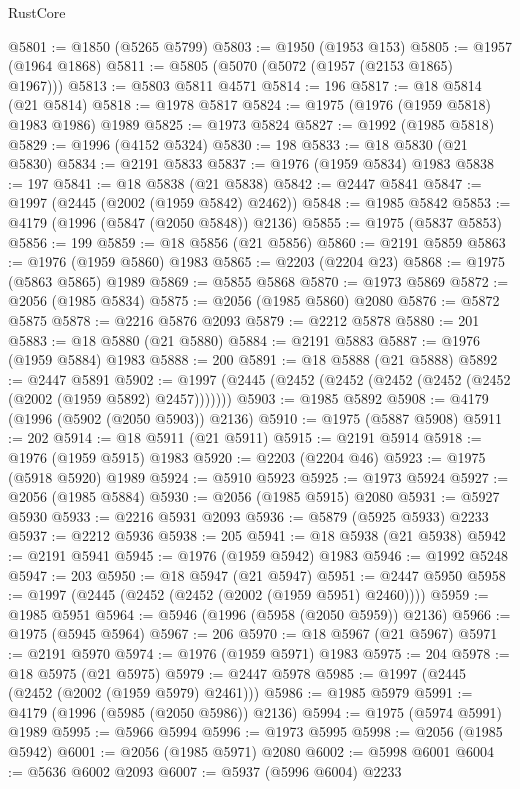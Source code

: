 \begin{lexlean}{RustCore}
\begin{coremodule}
@5801 := @1850 (@5265 @5799)
@5803 := @1950 (@1953 @153)
@5805 := @1957 (@1964 @1868)
@5811 := @5805 (@5070 (@5072 (@1957 (@2153 @1865) @1967)))
@5813 := @5803 @5811 @4571
@5814 := 196
@5817 := @18 @5814 (@21 @5814)
@5818 := @1978 @5817
@5824 := @1975 (@1976 (@1959 @5818) @1983 @1986) @1989
@5825 := @1973 @5824
@5827 := @1992 (@1985 @5818)
@5829 := @1996 (@4152 @5324)
@5830 := 198
@5833 := @18 @5830 (@21 @5830)
@5834 := @2191 @5833
@5837 := @1976 (@1959 @5834) @1983
@5838 := 197
@5841 := @18 @5838 (@21 @5838)
@5842 := @2447 @5841
@5847 := @1997 (@2445 (@2002 (@1959 @5842) @2462))
@5848 := @1985 @5842
@5853 := @4179 (@1996 (@5847 (@2050 @5848)) @2136)
@5855 := @1975 (@5837 @5853)
@5856 := 199
@5859 := @18 @5856 (@21 @5856)
@5860 := @2191 @5859
@5863 := @1976 (@1959 @5860) @1983
@5865 := @2203 (@2204 @23)
@5868 := @1975 (@5863 @5865) @1989
@5869 := @5855 @5868
@5870 := @1973 @5869
@5872 := @2056 (@1985 @5834)
@5875 := @2056 (@1985 @5860) @2080
@5876 := @5872 @5875
@5878 := @2216 @5876 @2093
@5879 := @2212 @5878
@5880 := 201
@5883 := @18 @5880 (@21 @5880)
@5884 := @2191 @5883
@5887 := @1976 (@1959 @5884) @1983
@5888 := 200
@5891 := @18 @5888 (@21 @5888)
@5892 := @2447 @5891
@5902 := @1997 (@2445 (@2452 (@2452 (@2452 (@2452 (@2452 (@2002 (@1959 @5892) @2457)))))))
@5903 := @1985 @5892
@5908 := @4179 (@1996 (@5902 (@2050 @5903)) @2136)
@5910 := @1975 (@5887 @5908)
@5911 := 202
@5914 := @18 @5911 (@21 @5911)
@5915 := @2191 @5914
@5918 := @1976 (@1959 @5915) @1983
@5920 := @2203 (@2204 @46)
@5923 := @1975 (@5918 @5920) @1989
@5924 := @5910 @5923
@5925 := @1973 @5924
@5927 := @2056 (@1985 @5884)
@5930 := @2056 (@1985 @5915) @2080
@5931 := @5927 @5930
@5933 := @2216 @5931 @2093
@5936 := @5879 (@5925 @5933) @2233
@5937 := @2212 @5936
@5938 := 205
@5941 := @18 @5938 (@21 @5938)
@5942 := @2191 @5941
@5945 := @1976 (@1959 @5942) @1983
@5946 := @1992 @5248
@5947 := 203
@5950 := @18 @5947 (@21 @5947)
@5951 := @2447 @5950
@5958 := @1997 (@2445 (@2452 (@2452 (@2002 (@1959 @5951) @2460))))
@5959 := @1985 @5951
@5964 := @5946 (@1996 (@5958 (@2050 @5959)) @2136)
@5966 := @1975 (@5945 @5964)
@5967 := 206
@5970 := @18 @5967 (@21 @5967)
@5971 := @2191 @5970
@5974 := @1976 (@1959 @5971) @1983
@5975 := 204
@5978 := @18 @5975 (@21 @5975)
@5979 := @2447 @5978
@5985 := @1997 (@2445 (@2452 (@2002 (@1959 @5979) @2461)))
@5986 := @1985 @5979
@5991 := @4179 (@1996 (@5985 (@2050 @5986)) @2136)
@5994 := @1975 (@5974 @5991) @1989
@5995 := @5966 @5994
@5996 := @1973 @5995
@5998 := @2056 (@1985 @5942)
@6001 := @2056 (@1985 @5971) @2080
@6002 := @5998 @6001
@6004 := @5636 @6002 @2093
@6007 := @5937 (@5996 @6004) @2233

\end{coremodule}
\end{lexlean}
